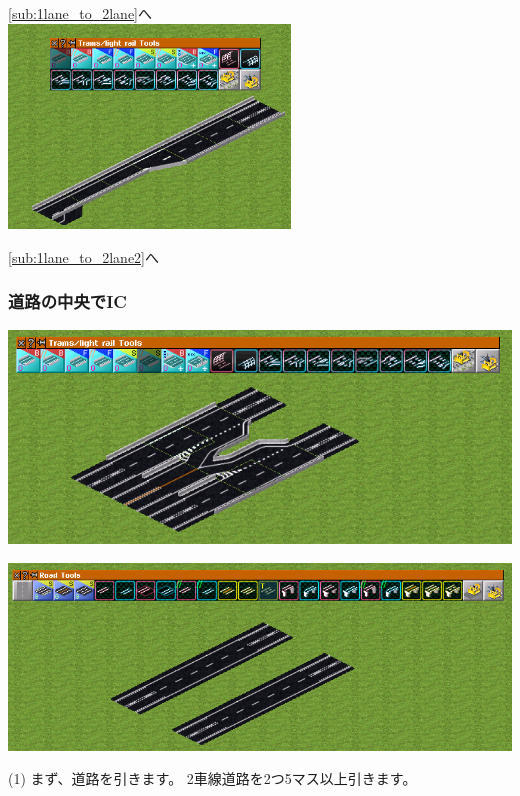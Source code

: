 \documentclass{jarticle}
\begin{document}
\begin{multicols}{2}
  \ref{sub:1lane_to_2lane}へ\\

  \includegraphics[width = 75mm]{picture/20210214-road-5-5.png}

  \ref{sub:1lane_to_2lane2}へ
\end{multicols}

\newpage

\subsubsection{道路の中央でIC}
\label{sub:IC_at_center}

  \includegraphics[width = 135mm]{picture/20210214-road-1-9.png}

  \vspace{10pt}


  \includegraphics[width = 135mm]{picture/20210214-road-1-1.png}

  (1)
  まず、道路を引きます。
  2車線道路を2つ5マス以上引きます。
  \\
\end{document}
